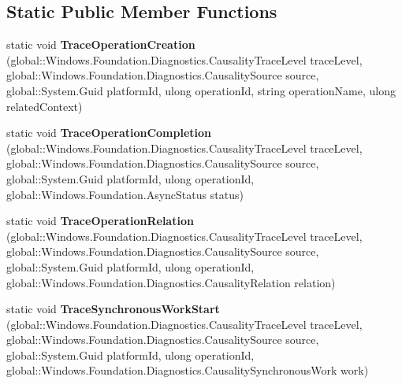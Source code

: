 \subsection*{Static Public Member Functions}
\begin{DoxyCompactItemize}
\item 
\mbox{\label{class_windows_1_1_foundation_1_1_diagnostics_1_1_async_causality_tracer_a7e21db63d48eac51522b889a4eaab22d}} 
static void {\bfseries Trace\+Operation\+Creation} (global\+::\+Windows.\+Foundation.\+Diagnostics.\+Causality\+Trace\+Level trace\+Level, global\+::\+Windows.\+Foundation.\+Diagnostics.\+Causality\+Source source, global\+::\+System.\+Guid platform\+Id, ulong operation\+Id, string operation\+Name, ulong related\+Context)
\item 
\mbox{\label{class_windows_1_1_foundation_1_1_diagnostics_1_1_async_causality_tracer_a6f0f3e531cde0820e070eaa0a2cb959a}} 
static void {\bfseries Trace\+Operation\+Completion} (global\+::\+Windows.\+Foundation.\+Diagnostics.\+Causality\+Trace\+Level trace\+Level, global\+::\+Windows.\+Foundation.\+Diagnostics.\+Causality\+Source source, global\+::\+System.\+Guid platform\+Id, ulong operation\+Id, global\+::\+Windows.\+Foundation.\+Async\+Status status)
\item 
\mbox{\label{class_windows_1_1_foundation_1_1_diagnostics_1_1_async_causality_tracer_aeac1886be232699acc5bbcfe37ed2ab2}} 
static void {\bfseries Trace\+Operation\+Relation} (global\+::\+Windows.\+Foundation.\+Diagnostics.\+Causality\+Trace\+Level trace\+Level, global\+::\+Windows.\+Foundation.\+Diagnostics.\+Causality\+Source source, global\+::\+System.\+Guid platform\+Id, ulong operation\+Id, global\+::\+Windows.\+Foundation.\+Diagnostics.\+Causality\+Relation relation)
\item 
\mbox{\label{class_windows_1_1_foundation_1_1_diagnostics_1_1_async_causality_tracer_a335d95a15aa1675ebbb7a8451d669e80}} 
static void {\bfseries Trace\+Synchronous\+Work\+Start} (global\+::\+Windows.\+Foundation.\+Diagnostics.\+Causality\+Trace\+Level trace\+Level, global\+::\+Windows.\+Foundation.\+Diagnostics.\+Causality\+Source source, global\+::\+System.\+Guid platform\+Id, ulong operation\+Id, global\+::\+Windows.\+Foundation.\+Diagnostics.\+Causality\+Synchronous\+Work work)

\end{DoxyCompactItemize}
